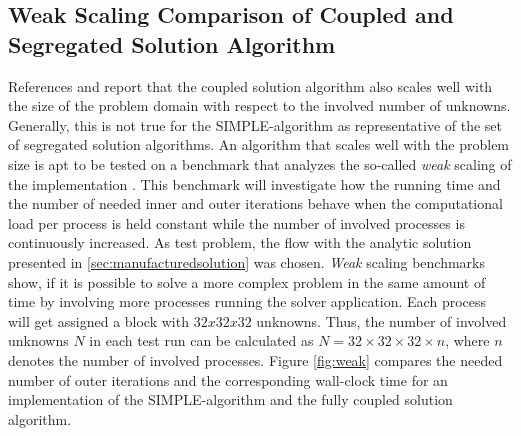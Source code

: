 \subsection{Weak Scaling Comparison of Coupled and Segregated Solution Algorithm}
\label{sec:weakscaling}

References \cite{darwish09} and \cite{vakilipour12} report that the coupled solution algorithm also scales well with the size of the problem domain with respect to the involved number of unknowns. Generally, this is not true for the SIMPLE-algorithm as representative of the set of segregated solution algorithms. An algorithm that scales well with the problem size is apt to be tested on a benchmark that analyzes the so-called \emph{weak} scaling of the implementation \cite{hager11}. This benchmark will investigate how the running time and the number of needed inner and outer iterations behave when the computational load per process is held constant while the number of involved processes is continuously increased. As test problem, the flow with the analytic solution presented in \ref{sec:manufacturedsolution} was chosen. \emph{Weak} scaling benchmarks show, if it is possible to solve a more complex problem in the same amount of time by involving more processes running the solver application. Each process will get assigned a block with \(32x32x32\) unknowns. Thus, the number of involved unknowns \(N\) in each test run can be calculated as \( N = 32\times32\times32\times n \), where \(n\) denotes the number of involved processes. Figure \ref{fig:weak} compares the needed number of outer iterations and the corresponding wall-clock time for an implementation of the SIMPLE-algorithm and the fully coupled solution algorithm.

